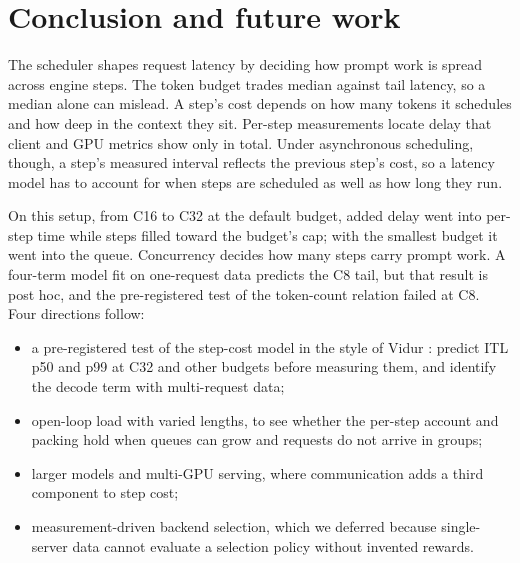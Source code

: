 \section{Conclusion and future work}
\label{sec:conclusion}

The scheduler shapes request latency by deciding how prompt work is spread across
engine steps. The token budget trades median against tail latency, so a median alone
can mislead. A step's cost depends on how many tokens it schedules and how deep in the
context they sit. Per-step measurements locate delay that client and GPU metrics show
only in total. Under asynchronous scheduling, though, a step's measured interval
reflects the previous step's cost, so a latency model has to account for when steps
are scheduled as well as how long they run.

On this setup, from C16 to C32 at the default budget, added delay went into per-step
time while steps filled toward the budget's cap; with the smallest budget it went into
the queue. Concurrency decides how many steps carry prompt work. A four-term model fit
on one-request data predicts the C8 tail, but that result is post hoc, and the
pre-registered test of the token-count relation failed at C8. Four directions follow:
\begin{itemize}
  \item a pre-registered test of the step-cost model in the style of Vidur
    \citep{agrawal2024vidur}: predict ITL p50 and p99 at C32 and other budgets before
    measuring them, and identify the decode term with multi-request data;
  \item open-loop load with varied lengths, to see whether the per-step account and
    packing hold when queues can grow and requests do not arrive in groups;
  \item larger models and multi-GPU serving, where communication adds a third
    component to step cost;
  \item measurement-driven backend selection, which we deferred because single-server
    data cannot evaluate a selection policy without invented rewards.
\end{itemize}

